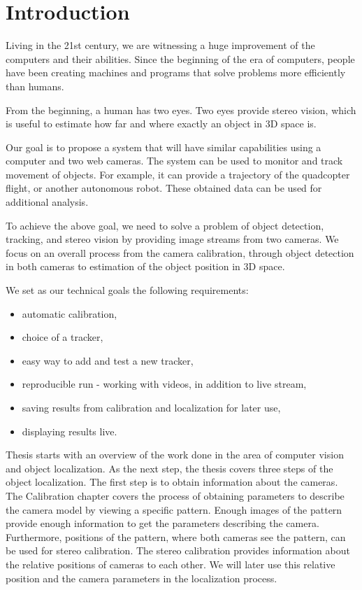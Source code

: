 \chapter*{Introduction}

Living in the 21st century, we are witnessing a huge improvement of the
computers and their abilities. Since the beginning of the era of computers,
people have been creating machines and programs that solve problems more
efficiently than humans.

From the beginning, a human has two eyes. Two eyes provide stereo vision, which
is useful to estimate how far and where exactly an object in 3D space is.

Our goal is to propose a system that will have similar capabilities using a
computer and two web cameras. The system can be used to monitor and track movement
of objects. For example, it can provide a trajectory of the quadcopter
flight, or another autonomous robot. These obtained data can be used for
additional analysis.

To achieve the above goal, we need to solve a problem of object detection,
tracking, and stereo vision by providing image streams from two cameras. We
focus on an overall process from the camera calibration, through object
detection in both cameras to estimation of the object position in 3D space.

We set as our technical goals the following requirements:
\begin{itemize}
\item automatic calibration,
\item choice of a tracker,
\item easy way to add and test a new tracker,
\item reproducible run - working with videos, in addition to live stream,
\item saving results from calibration and localization for later use,
\item displaying results live.
\end{itemize}

Thesis starts with an overview of the work done in the area of computer vision
and object localization. As the next step, the thesis covers three steps of the
object localization. The first step is to obtain information about the cameras.
The Calibration chapter covers the process of obtaining parameters to describe
the camera model by viewing a specific pattern. Enough images of the pattern
provide enough information to get the parameters describing the camera.
Furthermore, positions of the pattern, where both cameras see the pattern, can
be used for stereo calibration. The stereo calibration provides information
about the relative positions of cameras to each other. We will later use this
relative position and the camera parameters in the localization process.

